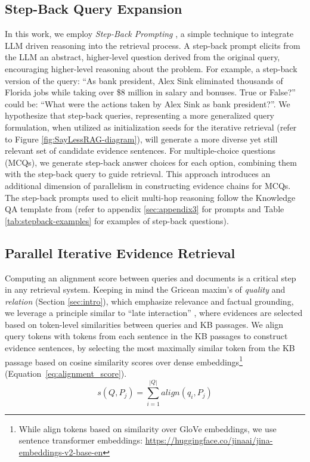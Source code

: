 \subsection{Step-Back Query Expansion}
\label{sec:step-back}
In this work, we employ \textit{Step-Back Prompting} \cite{zheng2024stepbackevokingreasoning}, a simple technique to integrate LLM driven reasoning into the retrieval process. A step-back prompt elicits from the LLM an abstract, higher-level question derived from the original query, encouraging higher-level reasoning about the problem. For example, a step-back version of the query: ``As bank president, Alex Sink eliminated thousands of Florida jobs while taking over \$8 million in salary and bonuses. True or False?'' could be: ``What were the actions taken by Alex Sink as bank president?''. We hypothesize that step-back queries, representing a more generalized query formulation, when utilized as initialization seeds for the iterative retrieval (refer to Figure \ref{fig:SayLessRAG-diagram}), will generate a more diverse yet still relevant set of candidate evidence sentences. For multiple-choice questions (MCQs), we generate step-back answer choices for each option, combining them with the step-back query to guide retrieval. This approach introduces an additional dimension of parallelism in constructing evidence chains for MCQs. The step-back prompts used to elicit multi-hop reasoning follow the Knowledge QA template from  (refer to appendix \ref{sec:appendix3} for prompts and Table \ref{tab:stepback-examples} for examples of step-back questions).
\subsection{Parallel Iterative Evidence Retrieval}
Computing an alignment score between queries and documents is a critical step in any retrieval system. Keeping in mind the Gricean maxim's of \textit{quality} and \textit{relation} (Section \ref{sec:intro}), which emphasize relevance and factual grounding, we leverage a principle similar to ``late interaction''
\citep{khattab2020colbertefficienteffectivepassage,santhanam2022colbertv2effectiveefficientretrieval}, where evidences are selected based on token-level similarities between queries and KB passages. We align query tokens with tokens from each sentence in the KB passages to construct evidence sentences, by selecting the most maximally similar token from the KB passage based on cosine similarity scores over dense embeddings\footnote{While  align tokens based on similarity over GloVe embeddings, we use sentence transformer embeddings: \url{https://huggingface.co/jinaai/jina-embeddings-v2-base-en}} (Equation~\ref{eq:alignment_score}). 
\begin{equation}
\label{eq:alignment_score}
s(Q, P_j) = \sum_{i=1}^{|Q|} align(q_i, P_j)
\end{equation}

